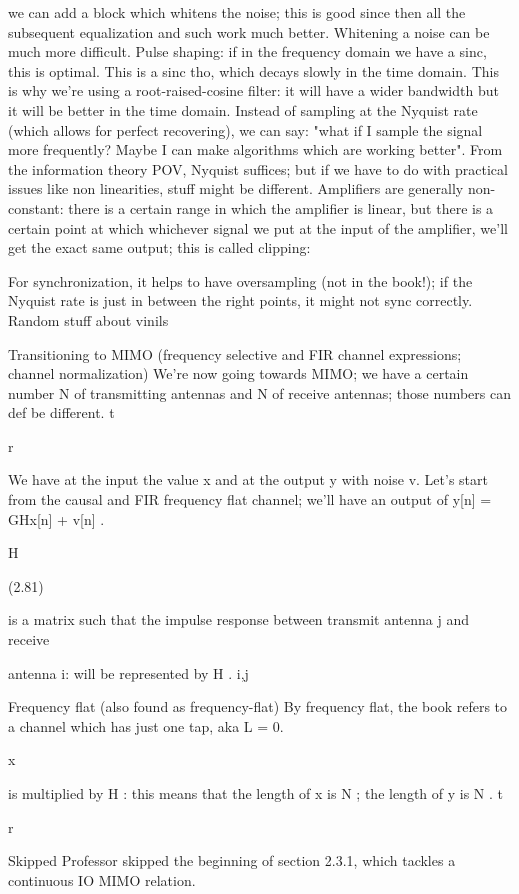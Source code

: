 {we can add a block which whitens the noise; this is good since then all the subsequent equalization and such work much better.
Whitening a noise can be much more difficult.
Pulse shaping: if in the frequency domain we have a sinc, this is optimal. This is a sinc tho, which decays slowly in the time domain.
This is why we're using a root-raised-cosine filter: it will have a wider bandwidth but it will be better in the time domain.
Instead of sampling at the Nyquist rate (which allows for perfect recovering), we can say: "what if I sample the signal more frequently? Maybe I can make algorithms which are working better". From the information theory POV, Nyquist suffices; but if we have to do with practical issues like non linearities, stuff might be different.
Amplifiers are generally non-constant: there is a certain range in which the amplifier is linear, but there is a certain point at which whichever signal we put at the input of the amplifier, we'll get the exact same output; this is called clipping:

For synchronization, it helps to have oversampling (not in the book!); if the Nyquist rate is just in between the right points, it might not sync correctly.
Random stuff about vinils

Transitioning to MIMO (frequency selective and FIR channel expressions; channel normalization)
We're now going towards MIMO; we have a certain number N of transmitting antennas and N of receive antennas; those numbers can def be different.
t

r

We have at the input the value x and at the output y with noise v.
Let's start from the causal and FIR frequency flat channel; we'll have an output of y[n] = \sqrt GHx[n] + v[n] .

H

(2.81)

is a matrix such that the impulse response between transmit antenna j and receive

antenna i: will be represented by H .
i,j

Frequency flat (also found as frequency-flat)
By frequency flat, the book refers to a channel which has just one tap, aka L = 0.

x

is multiplied by H : this means that the length of x is N ; the length of y is N .
t

r

Skipped Professor skipped the beginning of section 2.3.1, which tackles a continuous IO MIMO relation.

}
